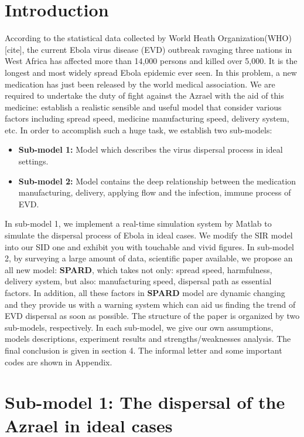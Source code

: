 
\section{Introduction}
According to the statistical data collected by World Heath Organization(WHO)[cite], the current Ebola virus disease (EVD) outbreak ravaging three nations in West Africa has affected more than 14,000 persons and killed over 5,000. It is the longest and most widely spread Ebola epidemic ever seen. In this problem, a new medication has just been released by the world medical association. We are required to undertake the duty of fight against the Azrael with the aid of this medicine: establish a realistic sensible and useful model that consider various factors including spread speed, medicine manufacturing speed, delivery system, etc. In order to accomplish such a huge task, we establish two sub-models:
\begin{itemize}
\item \textbf{Sub-model 1:} Model which describes the virus dispersal process in ideal settings.
\item \textbf{Sub-model 2:} Model contains the deep relationship between the medication manufacturing, delivery, applying flow and the infection, immune process of EVD. 
\end{itemize} 
In sub-model 1, we implement a real-time simulation system by Matlab to simulate the dispersal process of Ebola in ideal cases. We modify the SIR model into our SID one and exhibit you with touchable and vivid figures.
In sub-model 2, by surveying a large amount of data, scientific paper available, we propose an all new model: \textbf{SPARD}, which takes not only: spread speed, harmfulness, delivery system, but also: manufacturing speed, dispersal path as essential factors. In addition, all these factors in \textbf{SPARD} model are dynamic changing and they provide us with a warning system which can aid us finding the trend of EVD dispersal as soon as possible.
The structure of the paper is organized by two sub-models, respectively. In each sub-model, we give our own assumptions, models descriptions, experiment results and strengths/weaknesses analysis. The final conclusion is given in section 4. The informal letter and some important codes are shown in Appendix. 

\section{Sub-model 1: The dispersal of the Azrael in ideal cases}
